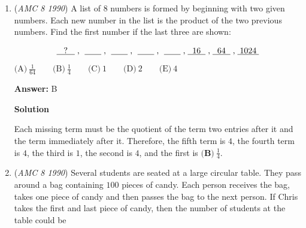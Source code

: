 \begin{enumerate}
 


	\item (\textit{AMC 8 1990}) A list of $8$ numbers is formed by beginning with two given numbers.  Each new number in the list is the product of the two previous numbers.  Find the first number if the last three are shown:

 \[\text{\underline{\hspace{3 mm}?\hspace{3 mm}}\hspace{1 mm},\hspace{1 mm} \underline{\hspace{7 mm}}\hspace{1 mm},\hspace{1 mm} \underline{\hspace{7 mm}}\hspace{1 mm},\hspace{1 mm} \underline{\hspace{7 mm}}\hspace{1 mm},\hspace{1 mm} \underline{\hspace{7 mm}}\hspace{1 mm},\hspace{1 mm}\underline{\hspace{2 mm}16\hspace{2 mm}}\hspace{1 mm},\hspace{1 mm}\underline{\hspace{2 mm}64\hspace{2 mm}}\hspace{1 mm},\hspace{1 mm}\underline{\hspace{1 mm}1024\hspace{1 mm}}}\]
$\text{(A)}\ \frac{1}{64} \qquad \text{(B)}\ \frac{1}{4} \qquad \text{(C)}\ 1 \qquad \text{(D)}\ 2 \qquad \text{(E)}\ 4$

 \textbf{Answer: }B



\textbf{Solution}

Each missing term must be the quotient of the term two entries after it and the term immediately after it.  Therefore, the fifth term is $4$, the fourth term is $4$, the third is $1$, the second is $4$, and the first is $\boxed{\textbf{(B)}\ \frac{1}{4}}$.

 


	\item (\textit{AMC 8 1990}) Several students are seated at a large circular table.  They pass around a bag containing $100$ pieces of candy.  Each person receives the bag, takes one piece of candy and then passes the bag to the next person.  If Chris takes the first and last piece of candy, then the number of students at the table could be



\end{enumerate}

